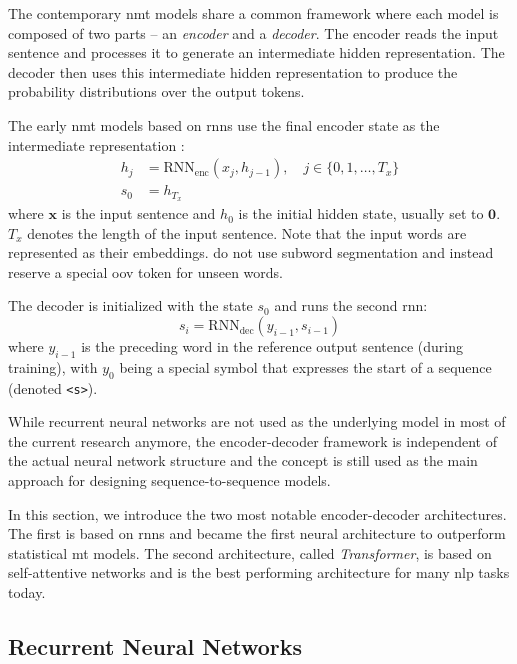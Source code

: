 The contemporary \ac{nmt} models share a common framework where each model is
composed of two parts -- an \emph{encoder} and a \emph{decoder}. The encoder
reads the input sentence and processes it to generate an intermediate hidden
representation.  The decoder then uses this intermediate hidden representation
to produce the probability distributions over the output tokens.

The early \ac{nmt} models based on \acp{rnn} use the final encoder state as the
intermediate representation \citep{sutskever2014sequence}:
%
\begin{align}
  h_j &= \mathrm{RNN}_{\text{enc}}(x_j, h_{j-1}), \quad j \in
          \{0, 1, \ldots, T_x \} \\
  s_0 &= h_{T_x}
\end{align}
%
where $\mathbf{x}$ is the input sentence and $h_0$ is the initial hidden state,
usually set to $\mathbf{0}$. $T_x$ denotes the length of the input sentence.
Note that the input words are represented as their embeddings.
\citet{sutskever2014sequence} do not use subword segmentation and instead
reserve a special \ac{oov} token for unseen words.

The decoder is initialized with the state $s_0$ and runs the second \ac{rnn}:
\begin{equation} s_i = \mathrm{RNN}_{\text{dec}}(y_{i-1}, s_{i-1})
\end{equation}
%
where $y_{i-1}$ is the preceding word in the reference output sentence (during
training), with $y_0$ being a special symbol that expresses the start of a
sequence (denoted \texttt{<s>}).

While recurrent neural networks are not used as the underlying model in most of
the current research anymore, the encoder-decoder framework is independent of
the actual neural network structure and the concept is still used as the main
approach for designing sequence-to-sequence models.

In this section, we introduce the two most notable encoder-decoder
architectures. The first is based on \acp{rnn} and became the first neural
architecture to outperform statistical \ac{mt} models. The second architecture,
called \emph{Transformer}, is based on self-attentive networks and is the best
performing architecture for many \ac{nlp} tasks today.


\subsection{Recurrent Neural Networks}
\label{sec:encdec:rnn}

